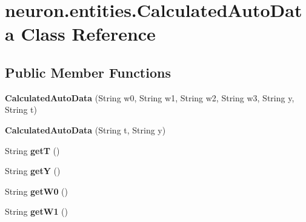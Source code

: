 \hypertarget{classneuron_1_1entities_1_1CalculatedAutoData}{}\section{neuron.\+entities.\+Calculated\+Auto\+Data Class Reference}
\label{classneuron_1_1entities_1_1CalculatedAutoData}
\subsection*{Public Member Functions}
\begin{DoxyCompactItemize}
\item 
\mbox{\label{classneuron_1_1entities_1_1CalculatedAutoData_a8e9858fd6d176a095b2036be7bc295b0}} 
{\bfseries Calculated\+Auto\+Data} (String w0, String w1, String w2, String w3, String y, String t)
\item 
\mbox{\label{classneuron_1_1entities_1_1CalculatedAutoData_a00d4b7951e0043db7e1341c12b35d481}} 
{\bfseries Calculated\+Auto\+Data} (String t, String y)
\item 
\mbox{\label{classneuron_1_1entities_1_1CalculatedAutoData_a368aec93ced2ef8df69aa76a2a30b655}} 
String {\bfseries getT} ()
\item 
\mbox{\label{classneuron_1_1entities_1_1CalculatedAutoData_a58ace0d7aabc3b227489865252838ace}} 
String {\bfseries getY} ()
\item 
\mbox{\label{classneuron_1_1entities_1_1CalculatedAutoData_a484f24c9fbc835a4d3b2d7c67f5dc26d}} 
String {\bfseries get\+W0} ()
\item 
\mbox{\label{classneuron_1_1entities_1_1CalculatedAutoData_a1a767aa5c8576724edb47cdaca225fdb}} 
String {\bfseries get\+W1} ()
\item 
\mbox{\label{classneuron_1_1entities_1_1CalculatedAutoData_a7e13268283b59cccfae25c3e683ea6b2}} 

\end{DoxyCompactItemize}
